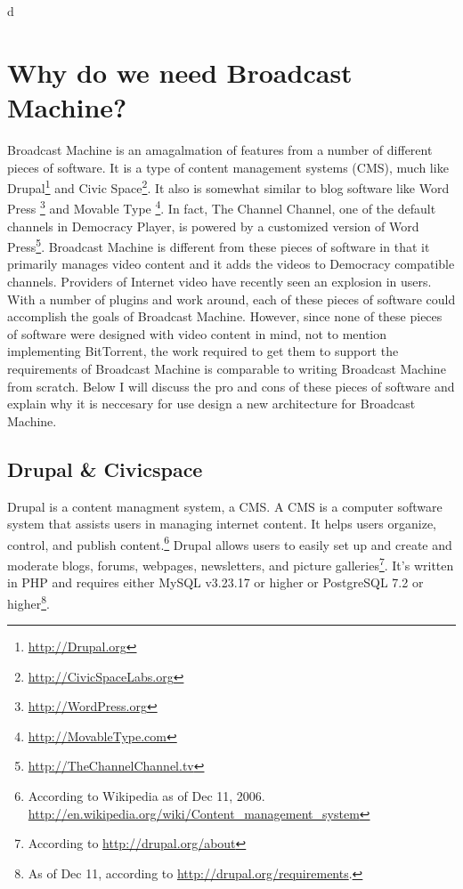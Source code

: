 d\documentclass[a4paper,12pt]{report}
\begin{document}
\section {Why do we need Broadcast Machine?}
	Broadcast Machine is an amagalmation of features from a number of different pieces of software.
It is a type of content management systems (CMS), much like Drupal\footnote{\url{http://Drupal.org}} and Civic Space\footnote{\url{http://CivicSpaceLabs.org}}.
It also is somewhat similar to blog software like Word Press \footnote{\url{http://WordPress.org}} and Movable Type \footnote{\url{http://MovableType.com}}. 
In fact, The Channel Channel, one of the default channels in Democracy Player, is powered by a customized version of Word Press\footnote{\url{http://TheChannelChannel.tv}}. 
Broadcast Machine is different from these pieces of software in that it primarily manages video content and it adds the videos to Democracy compatible channels. 
Providers of Internet video have recently seen an explosion in users. 
With a number of plugins and work around, each of these pieces of software could accomplish the goals of Broadcast Machine.
However, since none of these pieces of software were designed with video content in mind, not to mention implementing BitTorrent, the work required to get them to support the requirements of Broadcast Machine is comparable to writing Broadcast Machine from scratch.
Below I will discuss the pro and cons of these pieces of software and explain why it is neccesary for use design a new architecture for Broadcast Machine.

\subsection {Drupal & Civicspace}
Drupal is a content managment system, a CMS.
A CMS is a computer software system that assists users in managing internet content. 
It helps users organize, control, and publish content.\footnote{According to Wikipedia as of Dec 11, 2006.  \url{http://en.wikipedia.org/wiki/Content_management_system}}
Drupal allows users to easily set up and create and moderate blogs, forums, webpages, newsletters, and picture galleries\footnote{According to \url{http://drupal.org/about}}. 
It's written in PHP and requires either MySQL v3.23.17 or higher or PostgreSQL 7.2 or higher\footnote{As of Dec 11, according to \url{http://drupal.org/requirements}.}. 
\end{document}
